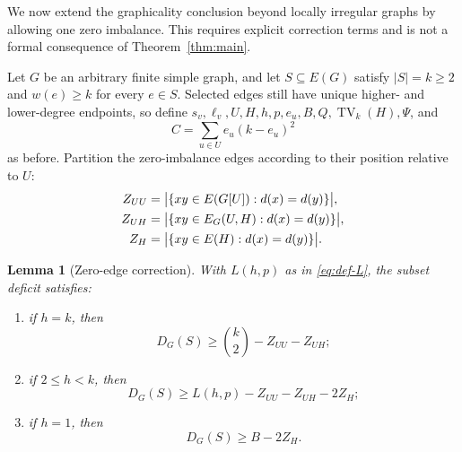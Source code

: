 \documentclass[a4paper,11pt]{amsart}
\numberwithin{equation}{section}
\newtheorem{lemma}[theorem]{Lemma}
\theoremstyle{definition}
\theoremstyle{remark}
\newcommand{\TV}{\operatorname{TV}}
\begin{document}
We now extend the graphicality conclusion beyond locally irregular graphs by allowing one zero imbalance.  This requires explicit correction terms and is not a formal consequence of Theorem~\ref{thm:main}.

Let $G$ be an arbitrary finite simple graph, and let $S\subseteq E(G)$ satisfy $\lvert S\rvert=k\ge2$ and $w(e)\ge k$ for every $e\in S$.  Selected edges still have unique higher- and lower-degree endpoints, so define $s_v,\ell_v,U,H,h,p,e_u,B,Q,\TV_k(H),\Psi$, and
\[
C=\sum_{u\in U}e_u(k-e_u)^2
\]
as before.  Partition the zero-imbalance edges according to their position relative to $U$:
\begin{align}
Z_{UU}&=\bigl\lvert\{xy\in E(G[U]):d(x)=d(y)\}\bigr\rvert,\notag\\
Z_{UH}&=\bigl\lvert\{xy\in E_G(U,H):d(x)=d(y)\}\bigr\rvert,\notag\\
Z_H&=\bigl\lvert\{xy\in E(H):d(x)=d(y)\}\bigr\rvert.
\label{eq:zero-counts}
\end{align}

\begin{lemma}[Zero-edge correction]\label{lem:zero-correction}
With $L(h,p)$ as in \eqref{eq:def-L}, the subset deficit satisfies:
\begin{enumerate}[label=\textup{(\roman*)}]
\item if $h=k$, then
\begin{equation}
D_G(S)\ge\binom{k}{2}-Z_{UU}-Z_{UH};
\label{eq:Z1}
\end{equation}
\item if $2\le h<k$, then
\begin{equation}
D_G(S)\ge L(h,p)-Z_{UU}-Z_{UH}-2Z_H;
\label{eq:Z2}
\end{equation}
\item if $h=1$, then
\begin{equation}
D_G(S)\ge B-2Z_H.
\label{eq:Z3}
\end{equation}
\end{enumerate}
\end{lemma}
\end{document}
